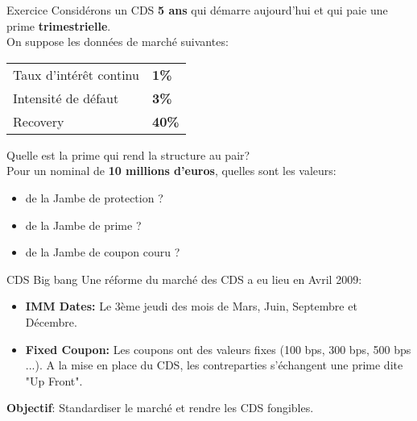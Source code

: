 \documentclass{beamer}
\begin{document}
\begin{frame}{Exercice}
Considérons un CDS \textbf{5 ans} qui démarre aujourd'hui et qui paie une prime \textbf{trimestrielle}.\\
\vspace{0.5cm}
On suppose les données de marché suivantes:\\
\begin{center}
\begin{tabular}{|l|l|}
\hline
Taux d'intérêt continu&\textbf{1\%}\\
Intensité de défaut&\textbf{3\%}\\
Recovery&\textbf{40\%}\\
\hline
\end{tabular}
\end{center}
Quelle est la prime qui rend la structure au pair?\\
Pour un nominal de \textbf{10 millions d'euros}, quelles sont les valeurs:\\
\begin{itemize}
\item de la Jambe de protection ?\\
\item de la Jambe de prime ? \\
\item de la Jambe de coupon couru ?\\
\end{itemize}
\end{frame}

\begin{frame}{CDS Big bang}
Une réforme du marché des CDS a eu lieu en Avril 2009:\\
\vspace{0.5cm}
\begin{itemize}
\item \textbf{IMM Dates:} Le 3ème jeudi des mois de Mars, Juin, Septembre et Décembre.
\item \textbf{Fixed Coupon:} Les coupons ont des valeurs fixes (100 bps, 300 bps, 500 bps ...). A la mise en place du CDS, les contreparties s'échangent une prime dite "Up Front".
\end{itemize}
\vspace{0.5cm}
\textbf{Objectif}: Standardiser le marché et rendre les CDS fongibles.
\end{frame}
\end{document}
